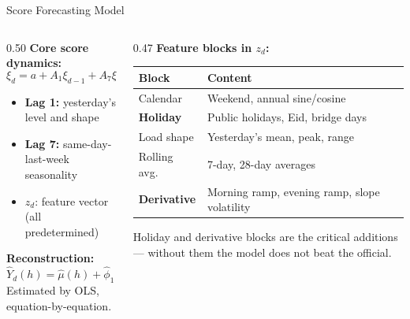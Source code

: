 \documentclass[10pt,aspectratio=169]{beamer}
\begin{document}
\begin{frame}{Score Forecasting Model}
  \begin{columns}
    \begin{column}{0.50\textwidth}
      \textbf{Core score dynamics:}
      \[
        \xi_d = a + A_1\xi_{d-1} + A_7\xi_{d-7} + Bz_d + u_d
      \]
      \begin{itemize}
        \item \textbf{Lag 1:} yesterday's level and shape
        \item \textbf{Lag 7:} same-day-last-week seasonality
        \item $z_d$: feature vector (all predetermined)
      \end{itemize}
      \vspace{0.5em}
      \textbf{Reconstruction:}
      \[
        \hat{Y}_{d}(h) = \hat\mu(h)
          + \hat\phi_1(h)\,\hat\xi_{d1}
          + \hat\phi_2(h)\,\hat\xi_{d2}
      \]
      Estimated by OLS, equation-by-equation.
    \end{column}
    \begin{column}{0.47\textwidth}
      \textbf{Feature blocks in $z_d$:}
      \vspace{0.3em}
      \small
      \begin{tabular}{lp{}}
        \toprule
        Block & Content \\
        \midrule
        Calendar          & Weekend, annual sine/cosine \\
        \textbf{Holiday}  & Public holidays, Eid, bridge days \\
        Load shape        & Yesterday's mean, peak, range \\
        Rolling avg.      & 7-day, 28-day averages \\
        \textbf{Derivative} & Morning ramp, evening ramp, slope volatility \\
        \bottomrule
      \end{tabular}
      \vspace{0.5em}

      \small Holiday and derivative blocks are the critical additions --- without them the model does not beat the official.
    \end{column}
  \end{columns}
\end{frame}
\end{document}
